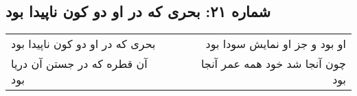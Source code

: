 \begin{center}
\section*{شماره ۲۱: بحری که در او دو کون ناپیدا بود}
\label{sec:021}
\begin{longtable}{l p{0.5cm} r}
بحری که در او دو کون ناپیدا بود
&&
او بود و جز او نمایش سودا بود
\\
آن قطره که در جستن آن دریا بود
&&
چون آنجا شد خود همه عمر آنجا بود
\\
\end{longtable}
\end{center}
